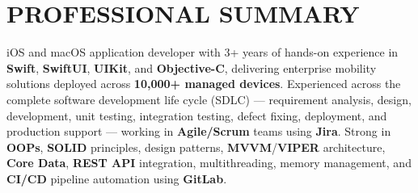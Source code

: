 \documentclass[letterpaper,11pt]{article}
\begin{document}
\vspace{-8pt}

\section{PROFESSIONAL SUMMARY}
\vspace{2pt}
\small iOS and macOS application developer with 3+ years of hands-on experience in \textbf{Swift}, \textbf{SwiftUI}, \textbf{UIKit}, and \textbf{Objective-C}, delivering enterprise mobility solutions deployed across \textbf{10,000+ managed devices}. Experienced across the complete software development life cycle (SDLC) — requirement analysis, design, development, unit testing, integration testing, defect fixing, deployment, and production support — working in \textbf{Agile/Scrum} teams using \textbf{Jira}. Strong in \textbf{OOPs}, \textbf{SOLID} principles, design patterns, \textbf{MVVM}/\textbf{VIPER} architecture, \textbf{Core Data}, \textbf{REST API} integration, multithreading, memory management, and \textbf{CI/CD} pipeline automation using \textbf{GitLab}.

\vspace{-4pt}

\end{document}
